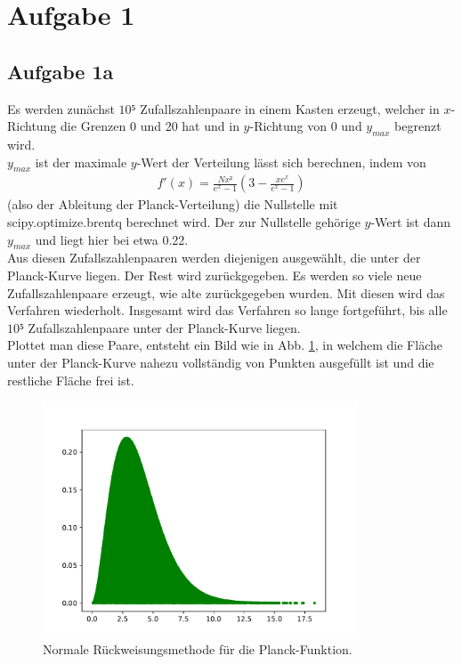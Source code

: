 



  \section{Aufgabe 1}

    \subsection{Aufgabe 1a}

      Es werden zunächst $10⁵$ Zufallszahlenpaare in einem Kasten erzeugt,
      welcher in $x$-Richtung die Grenzen 0 und 20 hat und in
      $y$-Richtung von 0 und $y_{max}$ begrenzt wird.\\
      $y_{max}$ ist der maximale $y$-Wert der Verteilung
      lässt sich berechnen, indem von
      \begin{align*}
        f'(x)=\frac{Nx²}{e^x-1}\left(3-\frac{xe^x}{e^x-1}\right)
      \end{align*}
      (also der Ableitung der Planck-Verteilung) die Nullstelle
      mit scipy.optimize.brentq berechnet wird. Der zur Nullstelle
      gehörige $y$-Wert ist dann $y_{max}$ und liegt hier bei etwa 0.22.\\
      Aus diesen Zufallszahlenpaaren werden diejenigen ausgewählt, die unter
      der Planck-Kurve liegen. Der Rest wird zurückgegeben. Es werden so
      viele neue Zufallszahlenpaare erzeugt, wie alte zurückgegeben wurden.
      Mit diesen wird das Verfahren wiederholt. Insgesamt wird das
      Verfahren so lange fortgeführt, bis alle $10⁵$ Zufallszahlenpaare
      unter der Planck-Kurve liegen. \\
      Plottet man diese Paare, entsteht ein Bild wie in Abb. \ref{fig:planck},
      in welchem die Fläche unter der Planck-Kurve nahezu vollständig
      von Punkten ausgefüllt ist und die restliche Fläche frei ist.

      \begin{figure}[H]
        \centering
        \includegraphics[height=7cm]{planck.pdf}
        \caption{Normale Rückweisungsmethode für die
        Planck-Funktion.}
        \label{fig:planck}
      \end{figure}

